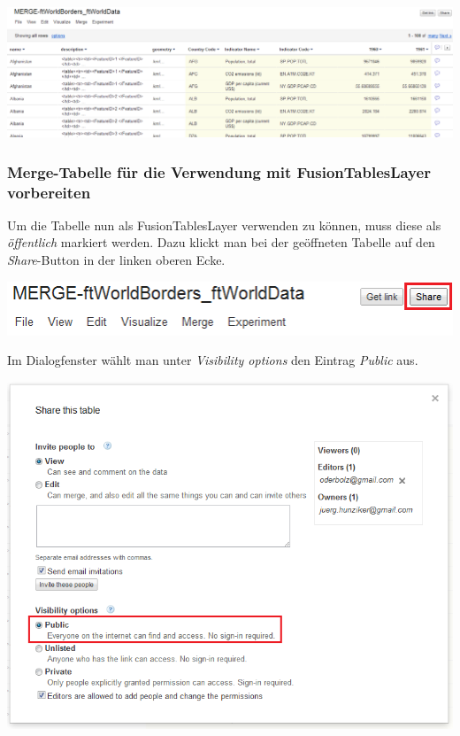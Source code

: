 \includegraphics[scale=0.4]{images/usecase1-worlddata/worlddata-merge_done.png}

\subsubsection{Merge-Tabelle für die Verwendung mit FusionTablesLayer vorbereiten}
Um die Tabelle nun als FusionTablesLayer verwenden zu können, muss diese als \emph{öffentlich} markiert werden. Dazu klickt man bei der geöffneten Tabelle auf den \emph{Share}-Button in der linken oberen Ecke.

\includegraphics{images/usecase1-worlddata/worlddata-prepare_fusiontableslayer1.png}

Im Dialogfenster wählt man unter \emph{Visibility options} den Eintrag \emph{Public} aus.

\includegraphics[scale=0.8]{images/usecase1-worlddata/worlddata-prepare_fusiontableslayer2.png}

